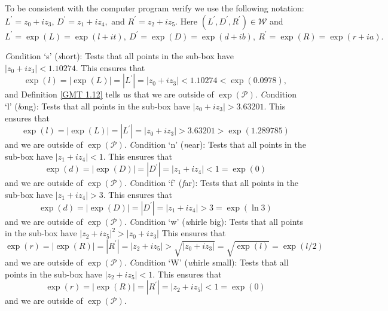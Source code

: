To be consistent with the computer program {\textit verify} we use the following notation: $L^{\prime} = z_0 + i z_3$,
$D^{\prime} = z_1 + i z_4,$ and $R^{\prime} = z_2 + i z_5.$  Here $(L^{\prime}, D^{\prime}, R^{\prime}) \in {\mathcal W}$ and
$L^{\prime} = \exp(L) = \exp(l+it),\   D^{\prime} = \exp(D) = \exp(d+ib),\  
R^{\prime} = \exp(R) = \exp(r+ia).$
\begin{the trivial conditions}  \label{GMT conditions 5.1}
{\textit Condition} `s' ({\textit short}):  Tests that all points in the sub-box have $|z_0 + i z_3| < 1.10274.$  This ensures that  
$$\exp(l) = |\exp(L)| = |L^{\prime}| = |z_0 + i z_3| < 1.10274 < \exp(0.0978),$$  and
Definition \ref{GMT 1.12}
 tells us that we are
outside of $\exp({\mathcal P}).$
{\textit Condition} `l' ({\textit long}): Tests that all points in the sub-box have $|z_0 + i z_3| > 3.63201.$  This ensures that  
$$\exp(l) = |\exp(L)| = |L^{\prime}| = |z_0 + i z_3| > 3.63201 > \exp(1.289785)$$ and we are outside of $\exp({\mathcal P}).$  
\vglue6pt
{\textit Condition} `n' ({\textit near}): Tests that all points in the sub-box have $|z_1 + i z_4| < 1.$  This ensures that 
$$\exp(d) = |\exp(D)| = |D^{\prime}| = |z_1 + i z_4| <1= \exp(0)$$ and we are outside of $\exp({\mathcal P}).$
\vglue6pt
{\textit Condition} `f' ({\textit far}): Tests that all points in the sub-box have $|z_1 + i z_4| > 3.$  This ensures that 
$$\exp(d) = |\exp(D)| = |D^{\prime}| = |z_1 + i z_4|  > 3= \exp(\ln 3)$$ and we are outside of $\exp({\mathcal P}).$  
\vskip 8pt
{\textit Condition} `w' ({\textit whirle  big}): Tests that all points in the sub-box have $|z_2 + i z_5|^2 > |z_0 + i z_3| $  This
ensures that $$\exp(r) = |\exp(R)| = |R^{\prime}| = |z_2 + i z_5|  > \sqrt{|z_0 + i z_3|} =  \sqrt {\exp(l)} = \exp(l/2)$$ and
we are outside of $\exp({\mathcal P}).$  
{\textit Condition} `W' ({\textit whirle  small}): Tests that all points in the sub-box have $|z_2 + i z_5| < 1. $  This ensures that
$$\exp(r) = |\exp(R)| = |R^{\prime}| = |z_2 + i z_5|  < 1 = \exp(0)$$ and we are outside of $\exp({\mathcal P}).$\end{the trivial conditions}

